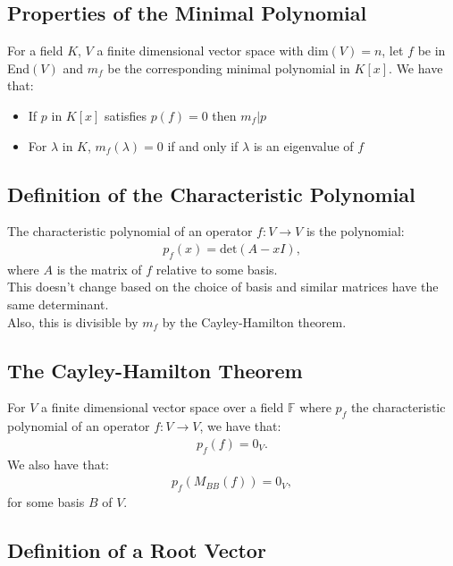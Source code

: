 \documentclass[a4paper, 12pt, twoside]{article}
\begin{document}
\subsection{Properties of the Minimal Polynomial}

For a field $K$, $V$ a finite dimensional vector space with dim$(V) = n$, let $f$ be in
End$(V)$ and $m_f$ be the corresponding minimal polynomial in $K[x]$.
We have that: \begin{itemize}
  \item If $p$ in $K[x]$ satisfies $p(f) = 0$ then $m_f | p$
  \item For $\lambda$ in $K$, $m_f(\lambda) = 0$ if and only if 
  $\lambda$ is an eigenvalue of $f$
\end{itemize}

\newpage

\subsection{Definition of the Characteristic Polynomial}

The characteristic polynomial of an operator $f : V \to V$ is the polynomial: \begin{gather*}
  p_f(x) = \text{det}(A - xI),
\end{gather*} where $A$ is the matrix of $f$ relative to some basis.
\\[\baselineskip]
This doesn't change based on the choice of basis and similar matrices have the same determinant.
\\[\baselineskip]
Also, this is divisible by $m_f$ by the Cayley-Hamilton theorem.

\subsection{The Cayley-Hamilton Theorem}

For $V$ a finite dimensional vector space over a field $\mathbb{F}$ where 
$p_f$ the characteristic polynomial of an operator $f : V \to V$, we have that: \begin{gather*}
  p_f(f) = 0_V.
\end{gather*} We also have that: \begin{gather*}
  p_f(M_{BB}(f)) = 0_V,
\end{gather*} for some basis $B$ of $V$.

\subsection{Definition of a Root Vector}
\end{document}
